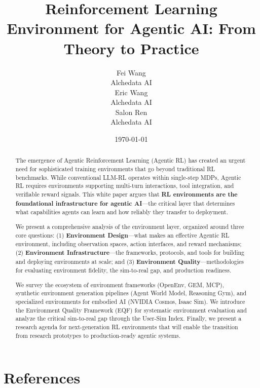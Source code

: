 \documentclass{article}
\title{\textbf{Reinforcement Learning Environment for Agentic AI: From Theory to Practice}}
\date{\today}
\author{
  Fei Wang \\
  Alchedata AI \\
  \And
  Eric Wang \\
  Alchedata AI \\
\And
    Salon Ren \\
  Alchedata AI \\
}
\begin{document}
\maketitle


\begin{abstract}
The emergence of Agentic Reinforcement Learning (Agentic RL) has created an urgent need for sophisticated training environments that go beyond traditional RL benchmarks. While conventional LLM-RL operates within single-step MDPs, Agentic RL requires environments supporting multi-turn interactions, tool integration, and verifiable reward signals. This white paper argues that \textbf{RL environments are the foundational infrastructure for agentic AI}---the critical layer that determines what capabilities agents can learn and how reliably they transfer to deployment.

We present a comprehensive analysis of the environment layer, organized around three core questions: (1) \textbf{Environment Design}---what makes an effective Agentic RL environment, including observation spaces, action interfaces, and reward mechanisms; (2) \textbf{Environment Infrastructure}---the frameworks, protocols, and tools for building and deploying environments at scale; and (3) \textbf{Environment Quality}---methodologies for evaluating environment fidelity, the sim-to-real gap, and production readiness.

We survey the ecosystem of environment frameworks (OpenEnv, GEM, MCP), synthetic environment generation pipelines (Agent World Model, Reasoning Gym), and specialized environments for embodied AI (NVIDIA Cosmos, Isaac Sim). We introduce the Environment Quality Framework (EQF) for systematic environment evaluation and analyze the critical sim-to-real gap through the User-Sim Index. Finally, we present a research agenda for next-generation RL environments that will enable the transition from research prototypes to production-ready agentic systems.
\end{abstract}

\tableofcontents
\newpage



\newpage
\section{References}
\label{sec:references}
\end{document}
